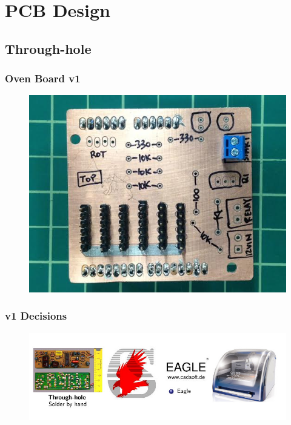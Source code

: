 \documentclass{beamer}
\begin{document}
\section{PCB Design} 
\subsection{Through-hole}
\begin{frame}
\frametitle{Oven Board v1}
\begin{figure}
\includegraphics[width=0.8\linewidth]{ovenboard-top.png}
\end{figure}
\end{frame}

\begin{frame}
\frametitle{v1 Decisions}
\begin{figure}
\includegraphics[width=1.0\linewidth]{decisions1.jpg}
\end{figure}
\end{frame}

\end{document}
